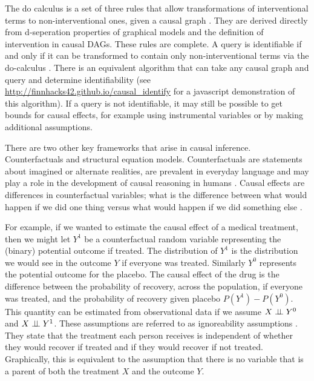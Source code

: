 \documentclass[11pt,a4paper]{article}
\begin{document}
The do calculus is a set of three rules that allow transformations of interventional terms to non-interventional ones, given a causal graph \cite{Pearl2000}. They are derived directly from d-seperation properties of graphical models and the definition of intervention in causal DAGs. These rules are complete. A query is identifiable if and only if it can be transformed to contain only non-interventional terms via the do-calculus \cite{Shpitser2006,Huang2006}. There is an equivalent algorithm that can take any causal graph and query and determine identifiability \cite {Shpitser2008} (see \url{http://finnhacks42.github.io/causal_identify} for a javascript demonstration of this algorithm). If a query is not identifiable, it may still be possible to get bounds for causal effects, for example using instrumental variables \cite{Angrist2009} or by making additional assumptions. 

There are two other key frameworks that arise in causal inference. Counterfactuals and structural equation models.  Counterfactuals are statements about imagined or alternate realities, are prevalent in everyday language and may play a role in the development of causal reasoning in humans \cite{Weisberg2013}. Causal effects are differences in counterfactual variables; what is the difference between what would happen if we did one thing versus what would happen if we did something else \cite{Rubin1974,Rubin1978,Rosenbaum1983, Rubin2005,Rubin2008}. 

For example, if we wanted to estimate the causal effect of a medical treatment, then we might let $Y^{1}$ be a counterfactual random variable representing the (binary) potential outcome if treated. The distribution of $Y^{1}$ is the distribution we would see in the outcome $Y$ if everyone was treated. Similarly $Y^{0}$ represents the potential outcome for the placebo. The causal effect of the drug is the difference between the probability of recovery, across the population, if everyone was treated, and the probability of recovery given placebo $P(Y^{1})-P(Y^{0})$. This quantity can be estimated from observational data if we assume $X \perp\!\!\!\perp Y^{0}$ and $X \perp\!\!\!\perp Y^{1}$. These assumptions are referred to as ignoreability assumptions \cite{Rosenbaum1983}. They state that the treatment each person receives is independent of whether they would recover if treated and if they would recover if not treated. Graphically, this is equivalent to the assumption that there is no variable that is a parent of both the treatment $X$ and the outcome $Y$. 
\end{document}
